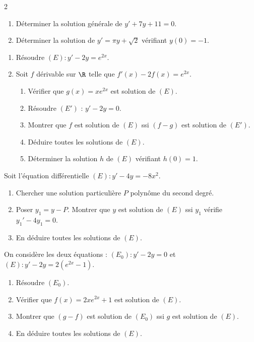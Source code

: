 \begin{multicols*}{2}
\begin{Exercice}
\begin{enumerate}
  \item D\'eterminer la solution g\'en\'erale de $y'+7y+11=0$.
  \item D\'eterminer la solution de $y'=\pi y+\sqrt{2}$ v\'erifiant $y(0)=-1$.
\end{enumerate}
\end{Exercice}

\begin{Exercice}
\begin{enumerate}
  \item R\'esoudre $(E):y'-2y=e^{2x}$.

  \item Soit $f$ d\'erivable sur $\R$ telle que $f'(x)-2f(x)=e^{2x}$.
    \begin{enumerate}[label=\alph*)]
      \item V\'erifier que $g(x)=xe^{2x}$ est solution de $(E)$.
      \item R\'esoudre $(E')$ : $y'-2y=0$.
      \item Montrer que $f$ est solution de $(E)$ ssi $(f-g)$ est solution de $(E')$.
      \item D\'eduire toutes les solutions de $(E)$.
      \item D\'eterminer la solution $h$ de $(E)$ v\'erifiant $h(0)=1$.
    \end{enumerate}
\end{enumerate}
\end{Exercice}

\begin{Exercice}
Soit l'\'equation diff\'erentielle $(E):y'-4y=-8x^2$.
\begin{enumerate}
  \item Chercher une solution particuli\`ere $P$ polyn\^ome du second degr\'e.
  \item Poser $y_1=y-P$. Montrer que $y$ est solution de $(E)$ ssi $y_1$ v\'erifie $y_1'-4y_1=0$.
  \item En d\'eduire toutes les solutions de $(E)$.
\end{enumerate}
\end{Exercice}

\begin{Exercice}
On consid\`ere les deux \'equations :
$(E_0):y'-2y=0$ \quad et \quad $(E):y'-2y=2(e^{2x}-1)$.
\begin{enumerate}
  \item R\'esoudre $(E_0)$.
  \item V\'erifier que $f(x)=2xe^{2x}+1$ est solution de $(E)$.
  \item Montrer que $(g-f)$ est solution de $(E_0)$ ssi $g$ est solution de $(E)$.
  \item En d\'eduire toutes les solutions de $(E)$.
\end{enumerate}
\end{Exercice}


\end{multicols*}
